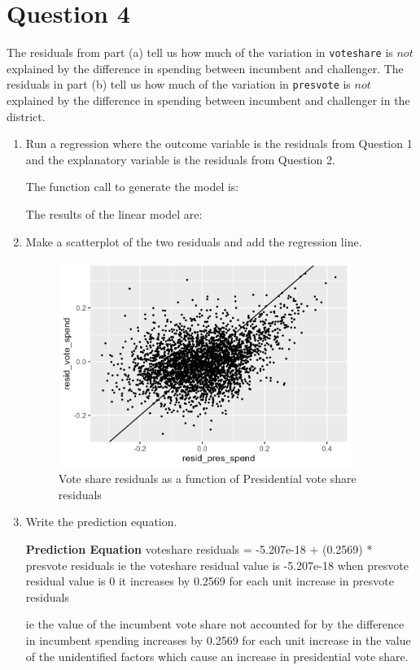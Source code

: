 \documentclass[12pt,letterpaper]{article}
\begin{document}
\newpage	

\section*{Question 4}
\noindent The residuals from part (a) tell us how much of the variation in \texttt{voteshare} is $not$ explained by the difference in spending between incumbent and challenger. The residuals in part (b) tell us how much of the variation in \texttt{presvote} is $not$ explained by the difference in spending between incumbent and challenger in the district.
	\begin{enumerate}
		\item Run a regression where the outcome variable is the residuals from Question 1 and the explanatory variable is the residuals from Question 2.	
		
  The function call to generate the model is:
	

	The results of the linear model are:
  

		\item Make a scatterplot of the two residuals and add the regression line.
	\begin{figure}
		  \includegraphics[width=0.9\textwidth]{Graphics/residuals.png}
		  \caption{Vote share residuals as a function of Presidential vote share residuals}
		  \label{fig:residuals}
	\end{figure}

		\item Write the prediction equation.
		
	\textbf{Prediction Equation}
	voteshare residuals  = -5.207e-18 + (0.2569) * presvote residuals
	ie the voteshare residual value is -5.207e-18 when presvote residual value is 0
	   it increases by 0.2569 for each unit increase in presvote residuals

  ie the value of the incumbent vote share not accounted for by the difference in incumbent spending increases by 0.2569 for each unit increase in the value of the unidentified factors which cause an increase in presidential vote share.

	\end{enumerate}
	
\end{document}
